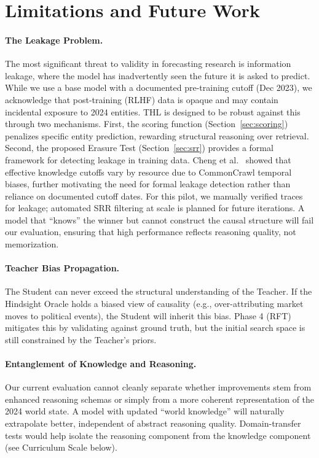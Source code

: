 \documentclass[11pt,a4paper]{article}
\begin{document}
\section{Limitations and Future Work}
\label{sec:limitations}

\paragraph{The Leakage Problem.}
The most significant threat to validity in forecasting research is information leakage, where the model has inadvertently seen the future it is asked to predict. While we use a base model with a documented pre-training cutoff (Dec 2023), we acknowledge that post-training (RLHF) data is opaque and may contain incidental exposure to 2024 entities.
THL is designed to be robust against this through two mechanisms. First, the scoring function (Section~\ref{sec:scoring}) penalizes specific entity prediction, rewarding structural reasoning over retrieval. Second, the proposed Erasure Test (Section~\ref{sec:srr}) provides a formal framework for detecting leakage in training data. Cheng et al.~\cite{cheng2025dated} showed that effective knowledge cutoffs vary by resource due to CommonCrawl temporal biases, further motivating the need for formal leakage detection rather than reliance on documented cutoff dates. For this pilot, we manually verified traces for leakage; automated SRR filtering at scale is planned for future iterations. A model that ``knows'' the winner but cannot construct the causal structure will fail our evaluation, ensuring that high performance reflects reasoning quality, not memorization.

\paragraph{Teacher Bias Propagation.}
The Student can never exceed the structural understanding of the Teacher. If the Hindsight Oracle holds a biased view of causality (e.g., over-attributing market moves to political events), the Student will inherit this bias. Phase 4 (RFT) mitigates this by validating against ground truth, but the initial search space is still constrained by the Teacher's priors.

\paragraph{Entanglement of Knowledge and Reasoning.}
Our current evaluation cannot cleanly separate whether improvements stem from enhanced reasoning schemas or simply from a more coherent representation of the 2024 world state. A model with updated ``world knowledge'' will naturally extrapolate better, independent of abstract reasoning quality. Domain-transfer tests would help isolate the reasoning component from the knowledge component (see Curriculum Scale below).
\end{document}
